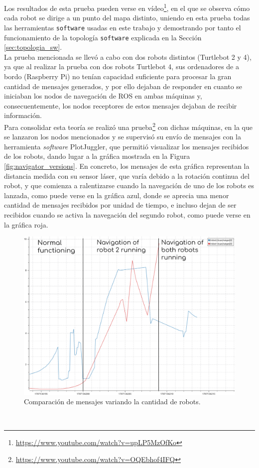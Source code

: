 Los resultados de esta prueba pueden verse en vídeo\footnote{
\href{https://www.youtube.com/watch?v=upLP5MzOfKo}{https://www.youtube.com/watch?v=upLP5MzOfKo}},
en el que se observa cómo cada robot se dirige a un punto del mapa distinto,
uniendo en esta prueba todas las herramientas \texttt{software} usadas en este
trabajo y demostrando por tanto el funcionamiento de la topología
\texttt{software} explicada en la Sección \ref{sec:topologia_sw}.
\\

La prueba mencionada se llevó a cabo con dos robots distintos (Turtlebot 2 y 4),
ya que al realizar la prueba con dos robots Turtlebot 4, sus ordenadores de a
bordo (Raspberry Pi) no tenían capacidad suficiente para procesar la gran
cantidad de mensajes generados, y por ello dejaban de responder en cuanto se
iniciaban los nodos de navegación de ROS en ambas máquinas y, consecuentemente,
los nodos receptores de estos mensajes dejaban de recibir información.
\\

Para consolidar esta teoría se realizó una prueba\footnote{
\href{https://www.youtube.com/watch?v=OQEbhof4IFQ}{https://www.youtube.com/watch?v=OQEbhof4IFQ}}
con dichas máquinas, en la que se lanzaron los nodos mencionados y se supervisó
su envío de mensajes con la herramienta \textit{software} PlotJuggler, que
permitió visualizar los mensajes recibidos de los robots, dando lugar a la
gráfica mostrada en la Figura \ref{fig:navigator_versions}.
En concreto, los mensajes de esta gráfica representan la distancia medida con su
sensor láser, que varía debido a la rotación continua del robot, y que comienza
a ralentizarse cuando la navegación de uno de los robots es lanzada, como puede
verse en la gráfica azul, donde se aprecia una menor cantidad de mensajes
recibidos por unidad de tiempo, e incluso dejan de ser recibidos cuando se
activa la navegación del segundo robot, como puede verse en la gráfica roja.
\\

\begin{figure} [h!]
  \begin{center}
    \includegraphics[width=12cm]{figs/plot_congestion_explained}
  \end{center}
  \caption{Comparación de mensajes variando la cantidad de robots.}
  \label{fig:plot_congestion}
\end{figure}\


